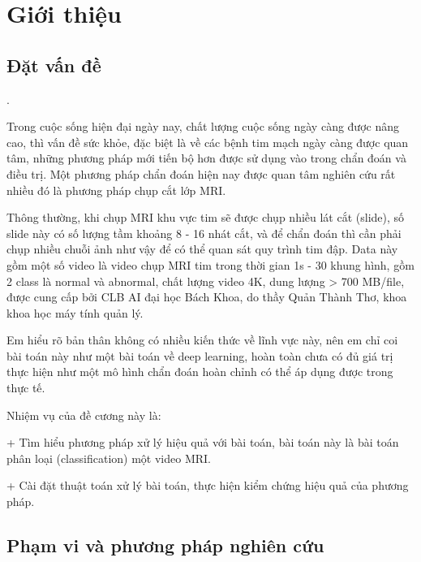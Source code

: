 \chapter{Giới thiệu} \label{sec:chuong-1} %

\section{Đặt vấn đề} \label{sec:chuong-1-datvande} %



. %

Trong cuộc sống hiện đại ngày nay, chất lượng cuộc sống ngày càng được nâng cao, thì vấn đề sức khỏe, đặc biệt là về các bệnh tim mạch ngày càng được quan tâm, những phương pháp mới tiến bộ hơn được sử dụng vào trong chẩn đoán và điều trị. Một phương pháp chẩn đoán hiện nay được quan tâm nghiên cứu rất nhiều đó là phương pháp chụp cắt lớp MRI. 

Thông thường, khi chụp MRI khu vực tim sẽ được chụp nhiều lát cắt (slide), số slide này có số lượng tầm khoảng 8 - 16 nhát cắt, và để chẩn đoán thì cần phải chụp nhiều chuỗi ảnh như vậy để có thể quan sát quy trình tim đập. Data này gồm một số video là video chụp MRI tim trong thời gian 1s - 30 khung hình, gồm 2 class là normal và abnormal, chất lượng video 4K, dung lượng > 700 MB/file, được cung cấp bởi CLB AI đại học Bách Khoa, do thầy Quản Thành Thơ, khoa khoa học máy tính quản lý.

Em hiểu rõ bản thân không có nhiều kiến thức về lĩnh vực này, nên em chỉ coi bài toán này như một bài toán về deep learning, hoàn toàn chưa có đủ giá trị thực hiện như một mô hình chẩn đoán hoàn chỉnh có thể áp dụng được trong thực tế.

Nhiệm vụ của đề cương này là: 

  + Tìm hiểu phương pháp xử lý hiệu quả với bài toán, bài toán này là bài toán phân loại (classification) một video MRI.
   
  + Cài đặt thuật toán xử lý bài toán, thực hiện kiểm chứng hiệu quả của phương pháp.


\section{Phạm vi và phương pháp nghiên cứu}
	
